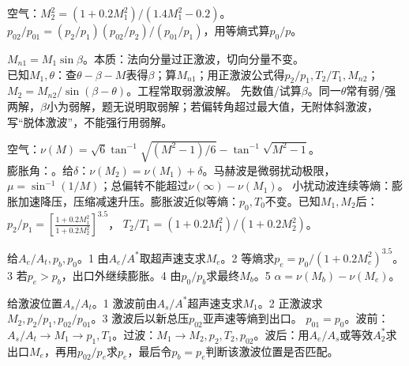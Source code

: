 空气：$M_2^2=(1+0.2M_1^2)/(1.4M_1^2-0.2)$。\\
$p_{02}/p_{01}=(p_2/p_1)(p_{02}/p_2)/(p_{01}/p_1)$，用等熵式算$p_0/p$。

$M_{n1}=M_1\sin\beta$。本质：法向分量过正激波，切向分量不变。\\
已知$M_1,\theta$：查$\theta-\beta-M$表得$\beta$；算$M_{n1}$；用正激波公式得$p_2/p_1,T_2/T_1,M_{n2}$；$M_2=M_{n2}/\sin(\beta-\theta)$。工程常取弱激波解。
先数值/试算$\beta$。同一$\theta$常有弱/强两解，$\beta$小为弱解，题无说明取弱解；若偏转角超过最大值，无附体斜激波，写“脱体激波”，不能强行用弱解。

空气：$\nu(M)=\sqrt6\tan^{-1}\sqrt{(M^2-1)/6}-\tan^{-1}\sqrt{M^2-1}$。\\
膨胀角：。给$\delta$：$\nu(M_2)=\nu(M_1)+\delta$。马赫波是微弱扰动极限，$\mu=\sin^{-1}(1/M)$；总偏转不能超过$\nu(\infty)-\nu(M_1)$。
小扰动波连续等熵：膨胀加速降压，压缩减速升压。膨胀波近似等熵：$p_0,T_0$不变。已知$M_1,M_2$后：
$p_2/p_1=\left[\frac{1+0.2M_1^2}{1+0.2M_2^2}\right]^{3.5}$，
$T_2/T_1=(1+0.2M_1^2)/(1+0.2M_2^2)$。

给$A_e/A_t,p_b,p_0$。1 由$A_e/A^*$取超声速支求$M_e$。2 等熵求$p_e=p_0/(1+0.2M_e^2)^{3.5}$。3 若$p_e>p_b$，出口外继续膨胀。4 由$p_0/p_b$求最终$M_b$。5 $\alpha=\nu(M_b)-\nu(M_e)$。

给激波位置$A_s/A_t$。1 激波前由$A_s/A^*$超声速支求$M_1$。2 正激波求$M_2,p_2/p_1,p_{02}/p_{01}$。3 激波后以新总压$p_{02}$亚声速等熵到出口。
$p_{01}=p_0$。波前：$A_s/A_t\to M_1\to p_1,T_1$。过波：$M_1\to M_2,p_2,T_2,p_{02}$。波后：用$A_e/A_s$或等效$A^*_2$求出口$M_e$，再用$p_{02}/p_e$求$p_e$，最后令$p_b=p_e$判断该激波位置是否匹配。


